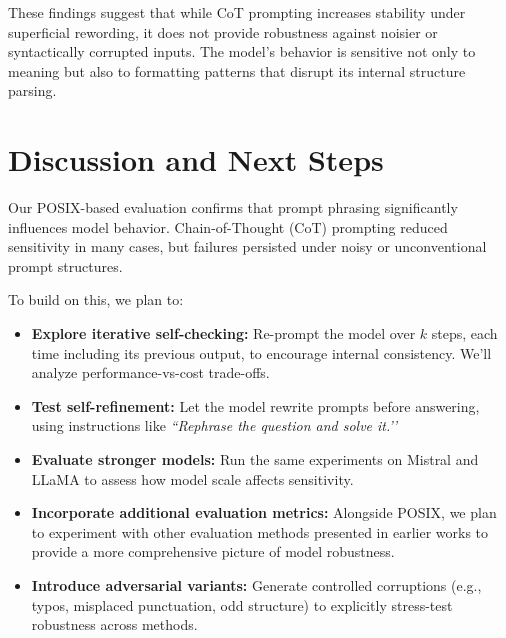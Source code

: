 \documentclass[fleqn,moreauthors,10pt]{ds_report}
\begin{document}
These findings suggest that while CoT prompting increases stability under superficial rewording, it does not provide robustness against noisier or syntactically corrupted inputs. The model’s behavior is sensitive not only to meaning but also to formatting patterns that disrupt its internal structure parsing.





\section*{Discussion and Next Steps}

Our POSIX-based evaluation confirms that prompt phrasing significantly influences model behavior. Chain-of-Thought (CoT) prompting reduced sensitivity in many cases, but failures persisted under noisy or unconventional prompt structures.

To build on this, we plan to:

\begin{itemize}[itemsep=2pt]
    \item \textbf{Explore iterative self-checking:} Re-prompt the model over $k$ steps, each time including its previous output, to encourage internal consistency. We'll analyze performance-vs-cost trade-offs.
    
    \item \textbf{Test self-refinement:} Let the model rewrite prompts before answering, using instructions like \textit{``Rephrase the question and solve it.’’}

    \item \textbf{Evaluate stronger models:} Run the same experiments on Mistral and LLaMA to assess how model scale affects sensitivity.

    \item \textbf{Incorporate additional evaluation metrics:} Alongside POSIX, we plan to experiment with other evaluation methods presented in earlier works to provide a more comprehensive picture of model robustness.

    \item \textbf{Introduce adversarial variants:} Generate controlled corruptions (e.g., typos, misplaced punctuation, odd structure) to explicitly stress-test robustness across methods.
\end{itemize}
\end{document}
